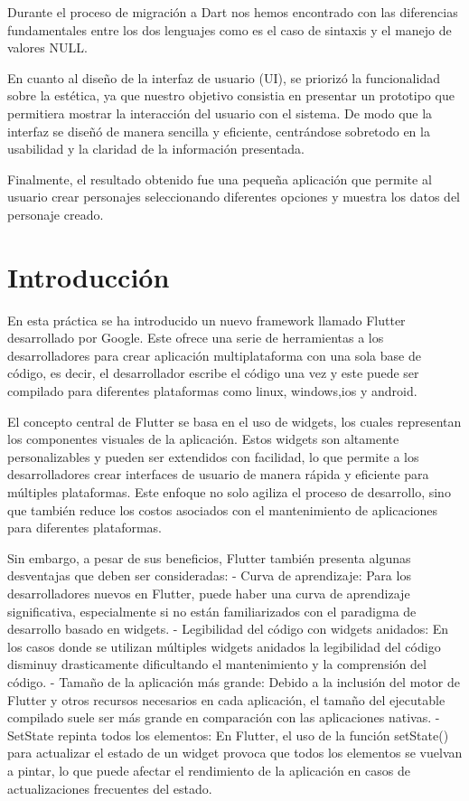 \documentclass{article}
\begin{document}
Durante el proceso de migración a Dart nos hemos encontrado con las diferencias fundamentales entre los dos lenguajes como es el caso de sintaxis y el manejo de valores NULL.

En cuanto al diseño de la interfaz de usuario (UI), se priorizó la funcionalidad sobre la estética, ya que nuestro objetivo consistia en presentar un prototipo que permitiera mostrar 
la interacción del usuario con el sistema. De modo que la interfaz se diseñó de manera sencilla y eficiente, centrándose sobretodo en la usabilidad y la claridad de la información presentada.

Finalmente, el resultado obtenido fue una pequeña aplicación que permite al usuario crear personajes seleccionando diferentes opciones y muestra los datos del personaje creado.


\section{Introducción}

En esta práctica se ha introducido un nuevo framework llamado Flutter desarrollado por Google. Este ofrece una serie de herramientas a los desarrolladores para 
crear aplicación multiplataforma con una sola base de código, es decir, el desarrollador escribe el código una vez y este puede ser compilado para diferentes plataformas como linux, windows,ios y android.

El concepto central de Flutter se basa en el uso de widgets, los cuales representan los componentes visuales de la aplicación. 
Estos widgets son altamente personalizables y pueden ser extendidos con facilidad, lo que permite a los desarrolladores crear interfaces
de usuario de manera rápida y eficiente para múltiples plataformas. Este enfoque no solo agiliza el proceso de desarrollo, sino que también 
reduce los costos asociados con el mantenimiento de aplicaciones para diferentes plataformas.

Sin embargo, a pesar de sus beneficios, Flutter también presenta algunas desventajas que deben ser consideradas:
- Curva de aprendizaje: Para los desarrolladores nuevos en Flutter, puede haber una curva de aprendizaje significativa, especialmente si no están familiarizados con el paradigma de desarrollo basado en widgets.
- Legibilidad del código con widgets anidados: En los casos donde se utilizan múltiples widgets anidados la legibilidad del código disminuy drasticamente dificultando el mantenimiento y la comprensión del código.
- Tamaño de la aplicación más grande: Debido a la inclusión del motor de Flutter y otros recursos necesarios en cada aplicación, el tamaño del ejecutable compilado suele ser más grande en comparación con las aplicaciones nativas.
- SetState repinta todos los elementos: En Flutter, el uso de la función setState() para actualizar el estado de un widget provoca que todos los elementos se vuelvan a pintar, lo que puede afectar el rendimiento de la aplicación en casos de actualizaciones frecuentes del estado.
\end{document}
